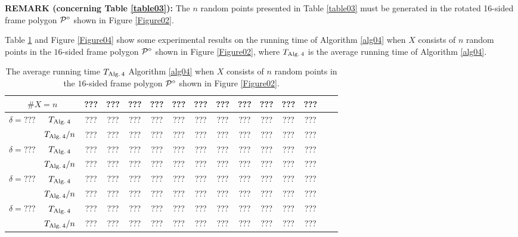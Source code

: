 \documentclass[12pt]{article}
\newcommand{\red}[1]{{\color{red} #1 }}
\begin{document}
\red{
\bigskip\noindent
{\bf REMARK (concerning Table \ref{table03}):} 
The $n$ random points presented in Table \ref{table03} must be generated in the rotated 16-sided frame polygon ${\cal P}^\diamond$ shown in Figure \ref{Figure02}.

\bigskip
}

\medskip
Table \ref{table04} and Figure \ref{Figure04} show some experimental results on the running time of Algorithm \ref{alg04} when $X$ consists of $n$ random points in the $16$-sided frame polygon ${\cal P}^\diamond$ shown in Figure \ref{Figure02}, where $T_{\rm Alg.\, 4}$ is the average running time of Algorithm \ref{alg04}.

		\begin{table}[ht]
	\begin{center}\renewcommand{\arraystretch}{1.2}\small
		\setlength\tabcolsep{0.05cm}
		\begin{tabular}{|c|c||c|c|c|c|c|c|c|c|c|c|c|c|c|}
		\hline
		\multicolumn {2}{|c||}{\footnotesize $\#X=n$}  & ???& ???& ???& ???& ???& ???& ???& ???& ???& ???& ??? \\ 
		\hline		
		\hline
		\multirow{2}{*}{ $\delta = ???$}

        & $T_{\rm Alg.\, 4}$  &   ???& ???& ???& ???& ???& ???& ???& ???& ???& ???& ??? \\
        		
		& $T_{\rm Alg.\, 4}/n$& ???& ???& ???& ???& ???& ???& ???& ???& ???& ???& ???   \\
		\hline
		\multirow{2}{*}{ $\delta = ???$}

        & $T_{\rm Alg.\, 4}$  &   ???& ???& ???& ???& ???& ???& ???& ???& ???& ???& ??? \\
        		
		& $T_{\rm Alg.\, 4}/n$& ???& ???& ???& ???& ???& ???& ???& ???& ???& ???& ???   \\
		\hline
		\multirow{2}{*}{ $\delta = ???$}

        & $T_{\rm Alg.\, 4}$  &   ???& ???& ???& ???& ???& ???& ???& ???& ???& ???& ??? \\
        		
		& $T_{\rm Alg.\, 4}/n$& ???& ???& ???& ???& ???& ???& ???& ???& ???& ???& ???   \\
		\hline
		\multirow{2}{*}{ $\delta = ???$}

        & $T_{\rm Alg.\, 4}$  &   ???& ???& ???& ???& ???& ???& ???& ???& ???& ???& ??? \\
        		
		& $T_{\rm Alg.\, 4}/n$& ???& ???& ???& ???& ???& ???& ???& ???& ???& ???& ???   \\
		\hline
	\end{tabular}
		\caption{The average running time $T_{\rm Alg.\, 4}$  Algorithm \ref{alg04} 
when $X$ consists of $n$ random points in the $16$-sided frame polygon ${\cal P}^\diamond$ shown in Figure \ref{Figure02}.}
		\label{table04}
	\end{center}
\end{table} 	
\end{document}
